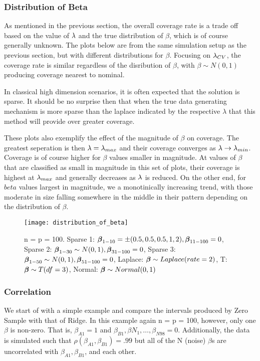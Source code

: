 \subsubsection{Distribution of Beta}

As mentioned in the previous section, the overall coverage rate is a trade off based on the value of $\lambda$ and the true distribution of $\beta$, which is of course generally unknown. The plots below are from the same simulation setup as the previous section, but with different distributions for $\beta$. Focusing on $\lambda_{CV}$, the coverage rate is similar regardless of the disribution of $\beta$, with $\beta \sim N(0, 1)$ producing coverage nearest to nominal.

In classical high dimension scenarios, it is often expected that the solution is sparse. It should be no surprise then that when the true data generating mechanism is more sparse than the laplace indicated by the respective $\lambda$ that this method will provide over greater coverage.

These plots also exemplify the effect of the magnitude of $\beta$ on coverage. The greatest seperation is then $\lambda = \lambda_{max}$ and their coverage converges as $\lambda \rightarrow \lambda_{min}$. Coverage is of course higher for $\beta$ values smaller in magnitude. At values of $\beta$ that are classified as small in magnitude in this set of plots, their coverage is highest at $\lambda_{max}$ and generally decreases as $\lambda$ is reduced. On the other end, for $beta$ values largest in magnitude, we a monotinically increasing trend, with those moderate in size falling somewhere in the middle in their pattern depending on the distribution of $\beta$.

\begin{figure}
  \texttt{[image: distribution\_of\_beta]}
  \caption{\label{Fig:distribution_of_beta} n = p = 100. Sparse 1: $\boldsymbol{\beta}_{1-10} = \pm(0.5, 0.5, 0.5, 1, 2), \boldsymbol{\beta}_{11-100} = 0$, Sparse 2: $\boldsymbol{\beta}_{1-30} \sim N(0, 1), \boldsymbol{\beta}_{31-100} = 0$, Sparse 3: $\boldsymbol{\beta}_{1-50} \sim N(0, 1), \boldsymbol{\beta}_{51-100} = 0$, Laplace: $\boldsymbol{\beta} \sim Laplace(rate = 2)$, T: $\boldsymbol{\beta} \sim T(df = 3)$, Normal: $\boldsymbol{\beta} \sim Normal(0, 1)$}
\end{figure}

\subsubsection{Correlation}

We start of with a simple example and compare the intervals produced by Zero Sample with that of Ridge. In this example again n = p = 100, however, only one $\beta$ is non-zero. That is, $\beta_{A1} = 1$ and $\beta_{B1}, \beta{N_1}, \ldots, \beta_{N98} = 0$. Additionally, the data is simulated such that $\rho(\beta_{A1}, \beta_{B1}) = .99$ but all of the N (noise) $\beta$s are uncorrelated with $\beta_{A1}, \beta_{B1}$, and each other.

